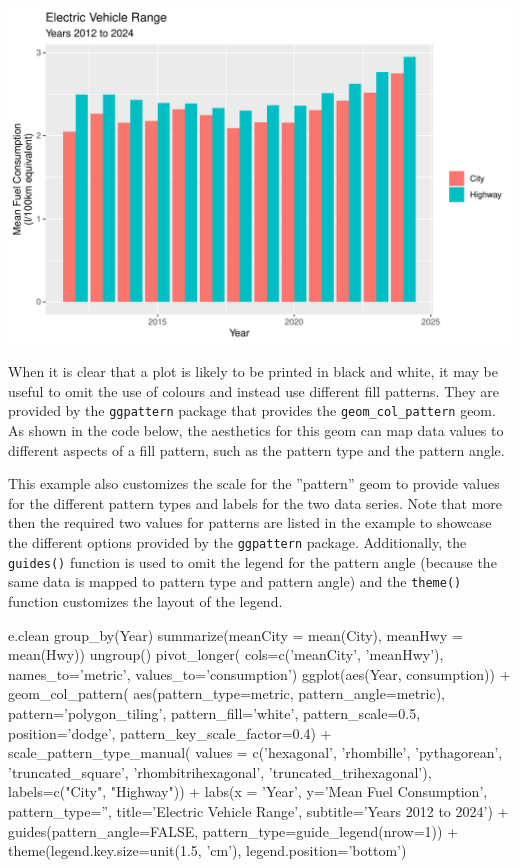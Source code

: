 \begin{center}
  \includegraphics[width=.8\textwidth]{fuel.columns.pdf}
\end{center}

When it is clear that a plot is likely to be printed in black and white, it may be useful to omit the use of colours and instead use different fill patterns. They are provided by the \texttt{ggpattern} package that provides the \texttt{geom\_col\_pattern} geom. As shown in the code below, the aesthetics for this geom can map data values to different aspects of a fill pattern, such as the pattern type and the pattern angle.

This example also customizes the scale for the ''pattern'' geom to provide values for the different pattern types and labels for the two data series. Note that more then the required two values for patterns are listed in the example to showcase the different options provided by the \texttt{ggpattern} package. Additionally, the \texttt{guides()} function is used to omit the legend for the pattern angle (because the same data is mapped to pattern type and pattern angle) and the \texttt{theme()} function customizes the layout of the legend.

\begin{Rcode}
e.clean %
   group_by(Year) %
   summarize(meanCity = mean(City), 
             meanHwy = mean(Hwy)) %
   ungroup() %
   pivot_longer(
        cols=c('meanCity', 'meanHwy'), 
        names_to='metric', 
        values_to='consumption') %
ggplot(aes(Year, consumption)) +
  geom_col_pattern(
         aes(pattern_type=metric, pattern_angle=metric),
     pattern='polygon_tiling',
     pattern_fill='white', 
     pattern_scale=0.5,
     position='dodge',
     pattern_key_scale_factor=0.4) +
  scale_pattern_type_manual(
     values = c('hexagonal', 'rhombille', 'pythagorean', 
                'truncated_square', 'rhombitrihexagonal', 
                'truncated_trihexagonal'), 
     labels=c("City", "Highway")) + 
  labs(x = 'Year', y='Mean Fuel Consumption', 
       pattern_type='', 
       title='Electric Vehicle Range', 
       subtitle='Years 2012 to 2024') +
  guides(pattern_angle=FALSE, 
         pattern_type=guide_legend(nrow=1)) + 
  theme(legend.key.size=unit(1.5, 'cm'), 
		legend.position='bottom')
\end{Rcode}

